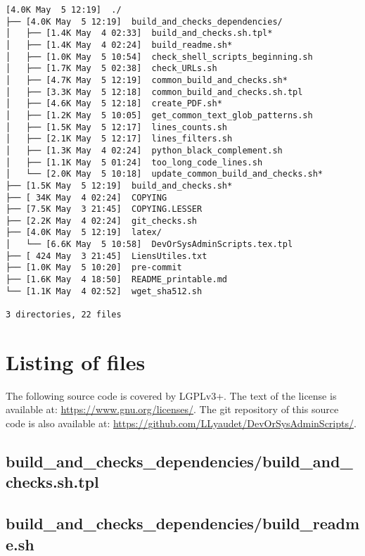 \documentclass{article}
\begin{document}
\begin{verbatim}
[4.0K May  5 12:19]  ./
├── [4.0K May  5 12:19]  build_and_checks_dependencies/
│   ├── [1.4K May  4 02:33]  build_and_checks.sh.tpl*
│   ├── [1.4K May  4 02:24]  build_readme.sh*
│   ├── [1.0K May  5 10:54]  check_shell_scripts_beginning.sh
│   ├── [1.7K May  5 02:38]  check_URLs.sh
│   ├── [4.7K May  5 12:19]  common_build_and_checks.sh*
│   ├── [3.3K May  5 12:18]  common_build_and_checks.sh.tpl
│   ├── [4.6K May  5 12:18]  create_PDF.sh*
│   ├── [1.2K May  5 10:05]  get_common_text_glob_patterns.sh
│   ├── [1.5K May  5 12:17]  lines_counts.sh
│   ├── [2.1K May  5 12:17]  lines_filters.sh
│   ├── [1.3K May  4 02:24]  python_black_complement.sh
│   ├── [1.1K May  5 01:24]  too_long_code_lines.sh
│   └── [2.0K May  5 10:18]  update_common_build_and_checks.sh*
├── [1.5K May  5 12:19]  build_and_checks.sh*
├── [ 34K May  4 02:24]  COPYING
├── [7.5K May  3 21:45]  COPYING.LESSER
├── [2.2K May  4 02:24]  git_checks.sh
├── [4.0K May  5 12:19]  latex/
│   └── [6.6K May  5 10:58]  DevOrSysAdminScripts.tex.tpl
├── [ 424 May  3 21:45]  LiensUtiles.txt
├── [1.0K May  5 10:20]  pre-commit
├── [1.6K May  4 18:50]  README_printable.md
└── [1.1K May  4 02:52]  wget_sha512.sh

3 directories, 22 files
\end{verbatim}

\section{Listing of files}
\label{section:listing}

The following source code is covered by LGPLv3+.
The text of the license is available at:
\url{https://www.gnu.org/licenses/}.
The git repository of this source code is also available at:
\url{https://github.com/LLyaudet/DevOrSysAdminScripts/}.


\subsection{
  build\_and\_checks\_dependencies/build\_and\_checks.sh.tpl
}
\label{
  build_and_checks_dependencies:build_and_checksshtpl
}



\subsection{
  build\_and\_checks\_dependencies/build\_readme.sh
}
\label{
  build_and_checks_dependencies:build_readmesh
}
\end{document}
